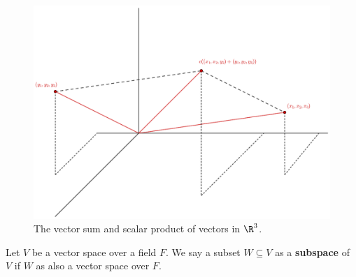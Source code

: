 \begin{figure}
    \centering
    \includegraphics[scale=0.5]{Figures/chapter2/vectorSumProduct.eps}
    \caption{The vector sum and scalar product of vectors in $\R^3$.}
    \label{fig_2.1}
\end{figure}

\begin{definition}
    Let $V$ be a vector space over a field  $F$. We say a subset  $W \subseteq
    V$ as a \textbf{subspace} of $V$ if  $W$ as also a vector space over $F$.
\end{definition}


